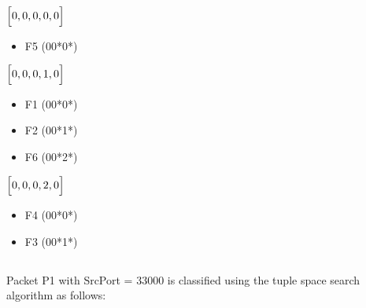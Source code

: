 \documentclass{article}
\begin{document}
        \begin{minipage}[t]{0.32\textwidth}
        
        $\Bigl[ 0 , 0 , 0 , 0 , 0 \Bigr]$
        
        \begin{itemize}
            \item F5 (00*0*)
        \end{itemize}
        \end{minipage}
        \hfill
        \begin{minipage}[t]{0.32\textwidth}
        
        $\Bigl[ 0 , 0 , 0 , 1 , 0 \Bigr]$
        
        \begin{itemize}
            \item F1 (00*0*)
            \item F2 (00*1*)
            \item F6 (00*2*)
        \end{itemize}
        \end{minipage}
        \hfill
        \begin{minipage}[t]{0.32\textwidth}
        
        $\Bigl[ 0 , 0 , 0 , 2 , 0 \Bigr]$
        
        \begin{itemize}
            \item F4 (00*0*)
            \item F3 (00*1*)
        \end{itemize}
        \end{minipage}
        
    \subsection{}

        Packet P1 with SrcPort = 33000 is classified using the tuple space search algorithm as follows: 
        
\end{document}
